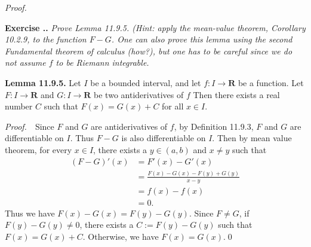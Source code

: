 \documentclass{book}
\newcommand{\pff}{\vspace{.25em}\noindent\emph{Proof.}~~}
\newcommand{\titl}[1]{\noindent\textbf{#1}}
\newcounter{Exercise}[section]
\renewcommand{\theExercise}{\thesection.\arabic{Exercise}.}
\newcommand{\new}{\vspace{1.5em}\noindent\textbf{{Exercise \stepcounter{Exercise}\textbf{\theExercise}}} }
\begin{document}
\pff

\new\emph{Prove Lemma 11.9.5. (Hint: apply the mean-value theorem, Corollary 10.2.9, to the function $F - G$. One can also prove this lemma using the second Fundamental theorem of calculus (how?), but one has to be careful since we do not assume $f$ to be Riemann integrable.}

\begin{framed}
\titl{Lemma 11.9.5.} Let $I$ be a bounded interval, and let $f : I \to \mathbf{R}$ be a function. Let $F : I \to \mathbf{R}$ and $G : I \to \mathbf{R}$ be two antiderivatives of $f$ Then there exists a real number $C$ such that $F(x) = G(x) + C$ for all $x \in I$.
\end{framed}

\pff Since $F$ and $G$ are antiderivatives of $f$, by Definition 11.9.3, $F$ and $G$ are differentiable on $I$. Thus $F - G$ is also differentiable on $I$. Then by mean value theorem, for every $x \in I$, there exists a $y \in (a, b)$ and $x \neq y$ such that
    \begin{align*}
        (F - G)'(x)
        &= F'(x) - G'(x)\\
        &= \frac{F(x) - G(x) - F(y) + G(y)}{x - y}\\
        &= f(x) - f(x)\\
        &= 0.
    \end{align*}
Thus we have $F(x) - G(x) = F(y) - G(y)$. Since $F \neq G$, if $F(y) - G(y) \neq 0$, there exists a $C := F(y) - G(y)$ such that $F(x) = G(x) + C$. Otherwise, we have $F(x) = G(x)$.\qed
\end{document}
